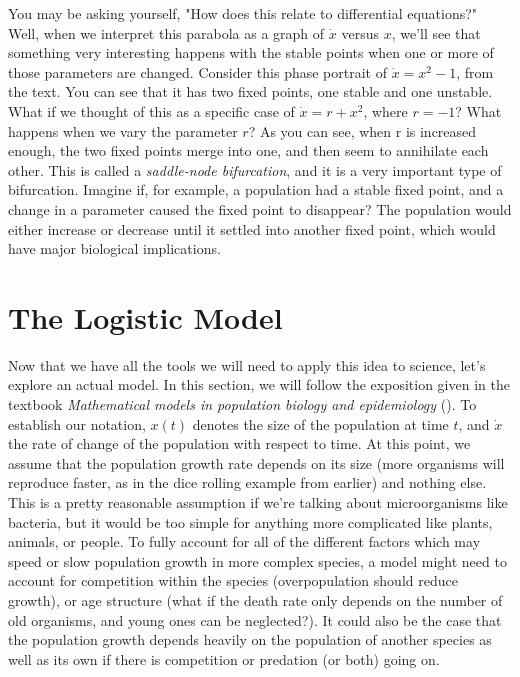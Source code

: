 \documentclass[man, 12pt]{apa6}
\newcommand{\citep}[1]{(\cite{#1})}
\begin{document}
You may be asking yourself, "How does this relate to differential equations?" Well, when we interpret this parabola as a graph of $\dot{x}$ versus $x$, we'll see that something very interesting happens with the stable points when one or more of those parameters are changed. Consider this phase portrait of $\dot{x}=x^2-1$, from the \cite{strogatz_1994} text. 
You can see that it has two fixed points, one stable and one unstable. What if we thought of this as a specific case of $\dot{x}=r+x^2$, where $r=-1$? What happens when we vary the parameter $r$?
As you can see, when r is increased enough, the two fixed points merge into one, and then seem to annihilate each other. This is called a \emph{saddle-node bifurcation}, and it is a very important type of bifurcation. Imagine if, for example, a population had a stable fixed point, and a change in a parameter caused the fixed point to disappear? The population would either increase or decrease until it settled into another fixed point, which would have major biological implications. 

\section{The Logistic Model}


Now that we have all the tools we will need to apply this idea to science, let's explore an actual model. In this section, we will follow the exposition given in the textbook \textit{Mathematical models in population biology and epidemiology} \citep{brauer_2014}. To establish our notation, $x(t)$ denotes the size of the population at time $t$, and $\dot{x}$ the rate of change of the population with respect to time. At this point, we assume that the population growth rate depends on its size (more organisms will reproduce faster, as in the dice rolling example from earlier) and nothing else. This is a pretty reasonable assumption if we're talking about microorganisms like bacteria, but it would be too simple for anything more complicated like plants, animals, or people. To fully account for all of the different factors which may speed or slow population growth in more complex species, a model might need to account for competition within the species (overpopulation should reduce growth), or age structure (what if the death rate only depends on the number of old organisms, and young ones can be neglected?). It could also be the case that the population growth depends heavily on the population of another species as well as its own if there is competition or predation (or both) going on. 
\end{document}
